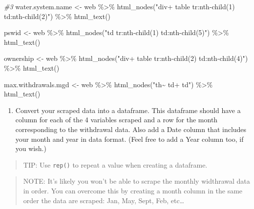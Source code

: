 \documentclass[
]{article}
\newenvironment{Shaded}{\begin{snugshade}}{\end{snugshade}}
\newcommand{\CommentTok}[1]{\textcolor[rgb]{0.56,0.35,0.01}{\textit{#1}}}
\newcommand{\FunctionTok}[1]{\textcolor[rgb]{0.00,0.00,0.00}{#1}}
\newcommand{\NormalTok}[1]{#1}
\newcommand{\OtherTok}[1]{\textcolor[rgb]{0.56,0.35,0.01}{#1}}
\newcommand{\SpecialCharTok}[1]{\textcolor[rgb]{0.00,0.00,0.00}{#1}}
\newcommand{\StringTok}[1]{\textcolor[rgb]{0.31,0.60,0.02}{#1}}
\providecommand{\tightlist}{%
  \setlength{\itemsep}{0pt}\setlength{\parskip}{0pt}}
\begin{document}
\begin{Shaded}
\begin{Highlighting}[]
\CommentTok{\#3}
\NormalTok{water.system.name }\OtherTok{\textless{}{-}}\NormalTok{ web }\SpecialCharTok{\%\textgreater{}\%} 
  \FunctionTok{html\_nodes}\NormalTok{(}\StringTok{"div+ table tr:nth{-}child(1) td:nth{-}child(2)"}\NormalTok{) }\SpecialCharTok{\%\textgreater{}\%} 
  \FunctionTok{html\_text}\NormalTok{()}

\NormalTok{pswid }\OtherTok{\textless{}{-}}\NormalTok{  web }\SpecialCharTok{\%\textgreater{}\%} 
  \FunctionTok{html\_nodes}\NormalTok{(}\StringTok{"td tr:nth{-}child(1) td:nth{-}child(5)"}\NormalTok{) }\SpecialCharTok{\%\textgreater{}\%} 
  \FunctionTok{html\_text}\NormalTok{()}

\NormalTok{ownership }\OtherTok{\textless{}{-}}\NormalTok{  web }\SpecialCharTok{\%\textgreater{}\%} 
  \FunctionTok{html\_nodes}\NormalTok{(}\StringTok{"div+ table tr:nth{-}child(2) td:nth{-}child(4)"}\NormalTok{) }\SpecialCharTok{\%\textgreater{}\%} 
  \FunctionTok{html\_text}\NormalTok{()}

\NormalTok{max.withdrawals.mgd }\OtherTok{\textless{}{-}}\NormalTok{  web }\SpecialCharTok{\%\textgreater{}\%} 
  \FunctionTok{html\_nodes}\NormalTok{(}\StringTok{"th\textasciitilde{} td+ td"}\NormalTok{) }\SpecialCharTok{\%\textgreater{}\%} 
  \FunctionTok{html\_text}\NormalTok{()}
\end{Highlighting}
\end{Shaded}

\begin{enumerate}
\def\labelenumi{\arabic{enumi}.}
\setcounter{enumi}{3}
\tightlist
\item
  Convert your scraped data into a dataframe. This dataframe should have
  a column for each of the 4 variables scraped and a row for the month
  corresponding to the withdrawal data. Also add a Date column that
  includes your month and year in data format. (Feel free to add a Year
  column too, if you wish.)
\end{enumerate}

\begin{quote}
TIP: Use \texttt{rep()} to repeat a value when creating a dataframe.
\end{quote}

\begin{quote}
NOTE: It's likely you won't be able to scrape the monthly widthrawal
data in order. You can overcome this by creating a month column in the
same order the data are scraped: Jan, May, Sept, Feb, etc\ldots{}
\end{quote}
\end{document}
